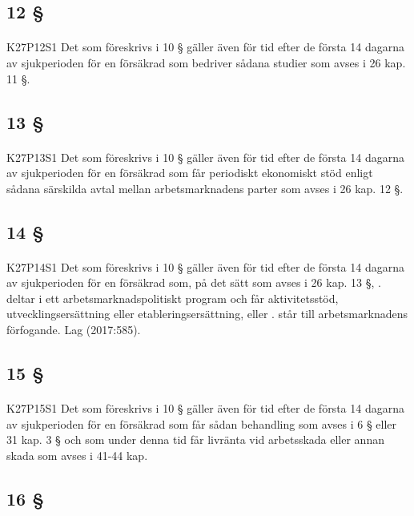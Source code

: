\documentclass[a4paper,notitlepage,openany,10pt]{book}
\begin{document}
\subsection*{12 §}
\paragraph*{}
{\tiny K27P12S1}
Det som föreskrivs i 10 § gäller även för tid efter de första 14 dagarna av sjukperioden för en försäkrad som bedriver sådana studier som avses i 26 kap. 11 §.
\subsection*{13 §}
\paragraph*{}
{\tiny K27P13S1}
Det som föreskrivs i 10 § gäller även för tid efter de första 14 dagarna av sjukperioden för en försäkrad som får periodiskt ekonomiskt stöd enligt sådana särskilda avtal mellan arbetsmarknadens parter som avses i 26 kap. 12 §.
\subsection*{14 §}
\paragraph*{}
{\tiny K27P14S1}
Det som föreskrivs i 10 § gäller även för tid efter de första 14 dagarna av sjukperioden för en försäkrad som, på det sätt som avses i 26 kap. 13 §,
. deltar i ett arbetsmarknadspolitiskt program och får aktivitetsstöd, utvecklingsersättning eller etableringsersättning, eller
. står till arbetsmarknadens förfogande.
Lag (2017:585).
\subsection*{15 §}
\paragraph*{}
{\tiny K27P15S1}
Det som föreskrivs i 10 § gäller även för tid efter de första 14 dagarna av sjukperioden för en försäkrad som får sådan behandling som avses i 6 § eller 31 kap. 3 § och som under denna tid får livränta vid arbetsskada eller annan skada som avses i 41-44 kap.
\subsection*{16 §}
\end{document}
